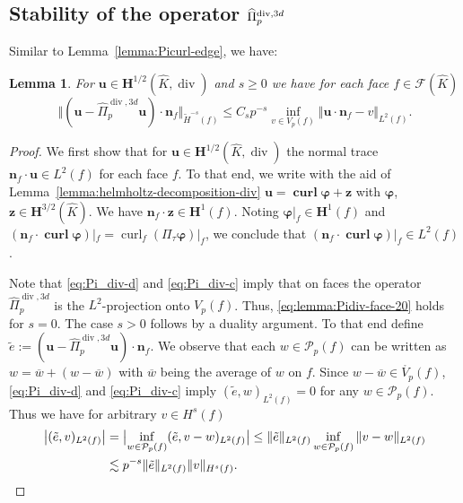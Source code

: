 \documentclass{article}
\newtheorem{lemma}[theorem]{Lemma}
\newcommand{\hatPidivcom}{\widehat\Pi^{\operatorname*{div},3d}_{p}}
\begin{document}

\subsection{Stability of the operator $\protect\hatPidivcom$}

Similar to Lemma~\ref{lemma:Picurl-edge}, we have:

\begin{lemma}
\label{lemma:Pidiv-face} For 
${\mathbf{u}}\in{\mathbf{H}}^{1/2}(\widehat{K},\operatorname*{div})$ and $s \ge 0$ 
we have for each face $f\in{\mathcal{F}}(\widehat{K})$ 
\begin{equation}
\Vert({\mathbf{u}}-\hatPidivcom{\mathbf{u}%
})\cdot{\mathbf{n}}_{f}\Vert_{\widetilde{H}^{-s}(f)}\leq C_s p^{-s}%
\inf_{v \in V_p(f)}
\Vert{\mathbf{u}}\cdot{\mathbf{n}}_{f} - v\Vert_{L^{2}(f)}. 
\label{eq:lemma:Pidiv-face-20}%
\end{equation}
\end{lemma}

\begin{proof}
We first show that for ${\mathbf u} \in {\mathbf H}^{1/2}(\widehat K,\operatorname{div})$
the normal trace ${\mathbf n}_f \cdot {\mathbf u} \in L^2(f)$ for each face $f$. To that end,
we write with the aid of Lemma~\ref{lemma:helmholtz-decomposition-div}
${\mathbf u} = \operatorname{\mathbf{curl}} {\boldsymbol \varphi} + {\mathbf z}$ with
${\boldsymbol \varphi}$, ${\mathbf z} \in {\mathbf H}^{3/2}(\widehat K)$. We have
${\mathbf n}_f \cdot {\mathbf z} \in {\mathbf H}^1(f)$. Noting
${\boldsymbol \varphi}|_f  \in {\mathbf H}^1(f)$ and
$({\mathbf n}_f \cdot \operatorname{\mathbf{curl}} {\boldsymbol \varphi})|_f  
= \operatorname{curl}_f (\Pi_\tau {\boldsymbol \varphi})|_f$, we conclude that
$({\mathbf n}_f \cdot \operatorname{\mathbf{curl}} {\boldsymbol \varphi})|_f \in L^2(f)$.


Note that \eqref{eq:Pi_div-d} and \eqref{eq:Pi_div-c} imply that on faces the operator $\hatPidivcom$ 
is the $L^2$-projection onto $V_p(f)$. Thus, \eqref{eq:lemma:Pidiv-face-20} holds for $s=0$. 
The case $s>0$ follows by a duality argument. 
To that end define $\tilde{e}:=\left(\mathbf{u}-\hatPidivcom\mathbf{u}\right)\cdot \mathbf{n}_f$. 
We observe that each $w\in \mathcal{P}_p(f)$ can be written as $w=\overline{w}+(w-\overline{w})$ 
with $\overline{w}$ being the average of $w$ on $f$. Since $w-\overline{w} \in \mathring{V_p}(f)$, \eqref{eq:Pi_div-d} and \eqref{eq:Pi_div-c} imply $(\tilde{e},w)_{L^2(f)} =0$ for any 
$w \in \mathcal{P}_p(f)$. Thus we have for arbitrary $v \in H^s(f)$ 
\begin{align*}
\bigl|(\tilde{e},v)_{L^2(f)}\bigr| &= \bigl|\inf_{w\in \mathcal{P}_p(f)} (\tilde{e},v-w)_{L^2(f)} \bigr| 
\leq \Vert\tilde{e}\Vert_{L^2(f)} \inf_{w\in\mathcal{P}_p(f)} \Vert v-w\Vert_{L^2(f)} \\
& \lesssim p^{-s} \Vert\tilde{e}\Vert_{L^2(f)} \Vert v\Vert_{H^s(f)}.
\qedhere
\end{align*}
\end{proof}
\end{document}
